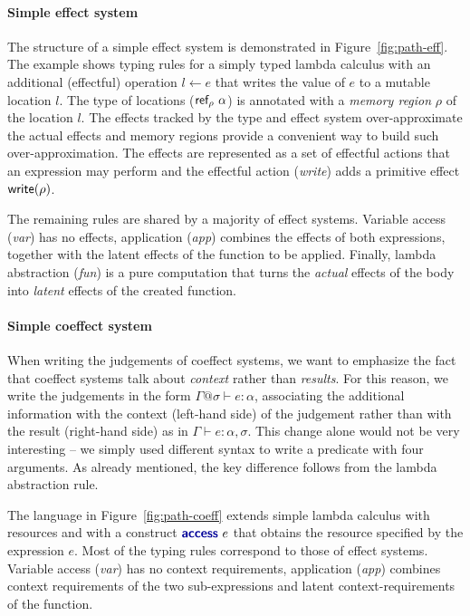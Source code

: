 \paragraph{Simple effect system}
The structure of a simple effect system is demonstrated in Figure~\ref{fig:path-eff}. The example
shows typing rules for a simply typed lambda calculus with an additional (effectful) operation
$l \leftarrow e$ that writes the value of $e$ to a mutable location $l$. The type of locations
($\textnormal{\sffamily ref}_\rho~\alpha$) is annotated with a \emph{memory region} $\rho$ of the location $l$.
The effects tracked by the type and effect system over-approximate the actual effects and memory
regions provide a convenient way to build such over-approximation. The effects are 
represented as a set of effectful actions that an expression may perform and the effectful action
(\emph{write}) adds a primitive effect $\textnormal{\sffamily write}(\rho)$.

The remaining rules are shared by a majority of effect systems. Variable access (\emph{var}) 
has no effects, application (\emph{app}) combines the effects of both expressions, together with 
the latent effects of the function to be applied. Finally, lambda abstraction (\emph{fun}) is a
pure computation that turns the \emph{actual} effects of the body into \emph{latent} effects of 
the created function.


\paragraph{Simple coeffect system}
When writing the judgements of coeffect systems, we want to emphasize the fact that coeffect 
systems talk about \emph{context} rather than \emph{results}. For this reason, we write the 
judgements in the form $\Gamma @ \sigma \vdash e : \alpha$, associating the additional information
with the context (left-hand side) of the judgement rather than with the result (right-hand side)
as in $\Gamma \vdash e : \alpha, \sigma$. This change alone would not be very interesting -- we 
simply used different syntax to write a predicate with four arguments. As already mentioned, the 
key difference follows from the lambda abstraction rule. 

The language in Figure~\ref{fig:path-coeff} extends simple lambda calculus with resources and
with a construct $\kvd{access}~e$ that obtains the resource specified by the expression $e$.
Most of the typing rules correspond to those of effect systems. Variable access (\emph{var}) 
has no context requirements, application (\emph{app}) combines context requirements of the two
sub-expressions and latent context-requirements of the function. 

